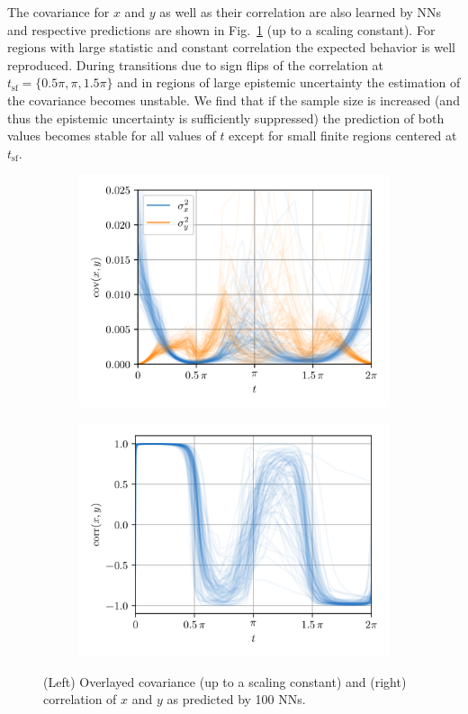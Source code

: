 \documentclass{article}
\begin{document}
The covariance for $x$ and $y$ as well as their correlation are also learned by NNs and respective predictions are shown in Fig.~\ref{fig:covcorr} (up to a scaling constant).
For regions with large statistic and constant correlation the expected behavior is well reproduced.
During transitions due to sign flips of the correlation at $t_\text{sf} = \{ 0.5\pi, \pi, 1.5\pi \}$ and in regions of large epistemic uncertainty the estimation of the covariance becomes unstable.
We find that if the sample size is increased (and thus the epistemic uncertainty is sufficiently suppressed) the  prediction of both values becomes stable for all values of $t$ except for small finite regions centered at $t_\text{sf}$.
\begin{figure}[htbp]
    \centering
    \begin{subfigure}{.49\textwidth}
        \centering
        \includegraphics[width=\textwidth]{cov.png}
    \end{subfigure}
    \begin{subfigure}{.49\textwidth}
        \centering
        \includegraphics[width=\textwidth]{corr.png}
    \end{subfigure}
    \caption{(Left) Overlayed covariance (up to a scaling constant) and (right) correlation of $x$ and $y$ as predicted by 100 NNs.}
    \label{fig:covcorr}
\end{figure}
\end{document}
